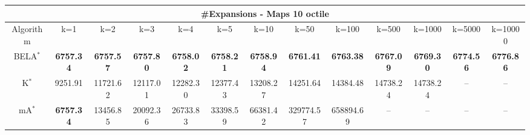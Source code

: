 \begin{tabular}{c|cccccccccccc}\toprule
\multicolumn{13}{c}{#Expansions - Maps 10 octile}\\ \midrule
Algorithm & k=1 & k=2 & k=3 & k=4 & k=5 & k=10 & k=50 & k=100 & k=500 & k=1000 & k=5000 & k=10000 \\ \midrule
BELA$^*$ & \textbf{6757.34} & \textbf{6757.57} & \textbf{6757.80} & \textbf{6758.02} & \textbf{6758.21} & \textbf{6758.94} & \textbf{6761.41} & \textbf{6763.38} & \textbf{6767.09} & \textbf{6769.30} & \textbf{6774.56} & \textbf{6776.86} \\
K$^*$ & 9251.91 & 11721.62 & 12117.01 & 12282.30 & 12377.43 & 13208.27 & 14251.64 & 14384.48 & 14738.24 & 14738.24 & -- & -- \\
mA$^*$ & \textbf{6757.34} & 13456.85 & 20092.36 & 26733.83 & 33398.59 & 66381.42 & 329774.57 & 658894.69 & -- & -- & -- & -- \\ \bottomrule 
\end{tabular}
